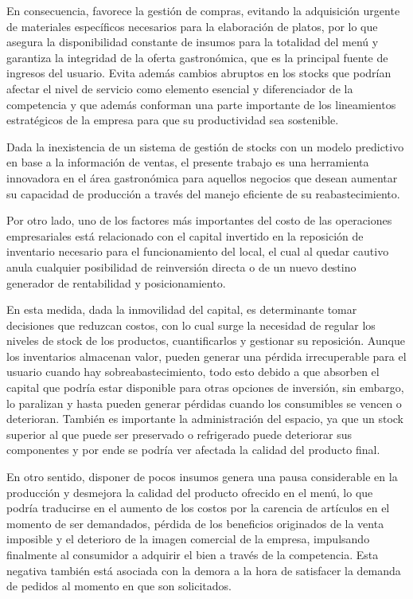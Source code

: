 En consecuencia, favorece la gestión de compras, evitando la adquisición urgente de materiales específicos necesarios para la elaboración de platos, por lo que asegura la disponibilidad constante de insumos para la totalidad del menú y garantiza la integridad de la oferta gastronómica, que es la principal fuente de ingresos del usuario. Evita además cambios abruptos en los stocks que podrían afectar el nivel de servicio como elemento esencial y diferenciador de la competencia y que además conforman una parte importante de los lineamientos estratégicos de la empresa para que su productividad sea sostenible.  

Dada la inexistencia de un sistema de gestión de stocks con un modelo predictivo en base a la información de ventas, el presente trabajo es una herramienta innovadora en el área gastronómica para aquellos negocios que desean aumentar su capacidad de  producción a través del manejo eficiente de su reabastecimiento.

Por otro lado, uno de los factores más importantes del costo de las operaciones empresariales está relacionado con el capital  invertido en la reposición de inventario necesario para el funcionamiento del local, el cual al quedar cautivo anula cualquier posibilidad de reinversión directa o de un nuevo destino generador de rentabilidad y posicionamiento.

En esta medida, dada la inmovilidad del capital, es determinante tomar decisiones que reduzcan costos, con lo cual surge la necesidad de regular los niveles de stock de los productos, cuantificarlos y gestionar su reposición. Aunque los inventarios almacenan valor, pueden generar una pérdida irrecuperable para el usuario cuando hay sobreabastecimiento, todo esto debido a que absorben el capital que podría estar disponible para otras opciones de inversión, sin embargo, lo paralizan y hasta pueden generar pérdidas cuando los consumibles se vencen o deterioran. También es importante la administración del espacio, ya que un stock superior al que puede ser preservado o refrigerado puede deteriorar sus componentes y por ende se podría ver afectada la calidad del producto final.

En otro sentido, disponer de pocos insumos genera una pausa considerable en la producción y  desmejora la calidad del producto ofrecido en el menú, lo que podría traducirse en el aumento de los costos por la carencia de artículos en el momento de ser demandados, pérdida de los beneficios originados de la venta imposible y el deterioro de la imagen comercial de la empresa, impulsando finalmente al consumidor a adquirir el bien a través de la competencia. Esta negativa también está asociada con la demora a la hora de satisfacer la demanda de pedidos al  momento en que son solicitados. 

